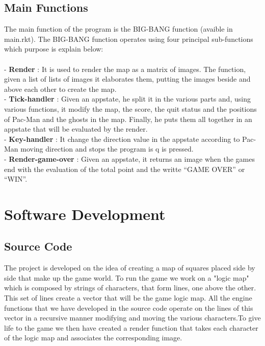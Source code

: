 \documentclass{article}
\begin{document}
 \subsection{Main Functions}
The main function of the program is the BIG-BANG function (avaible in main.rkt). The BIG-BANG function operates using four principal sub-functions which purpose is explain below:\\\\
- \textbf{Render} : It is used to render the map as a matrix of images. The function, given a list of lists of images it elaborates them, putting the images beside and above each other to create the map.\\
- \textbf{Tick-handler} : Given an appstate, he split it in the various parts and, using various functions, it modify the map, the score, the quit status and the positions of Pac-Man and the ghosts in the map. Finally, he puts them all together in an appstate that will be evaluated by the render. \\
- \textbf{Key-handler} : It change the direction value in the appstate according to Pac-Man moving direction and stops the program is q is pressed.\\
- \textbf{Render-game-over} : Given an appstate, it returns an image when the games end with the evaluation of the total point and the writte ``GAME OVER'' or ``WIN''.


 \section{Software Development}

 \subsection{Source Code}
 The project is developed on the idea of creating a map of squares placed side by side that make up the game world. To run the game we work on a "logic map" which is composed by strings of characters, that form lines, one above the other. This set of lines create a vector that will be the game logic map. All the engine functions that we have developed in the source code operate on the lines of this vector in a recursive manner modifying and moving the various characters.To give life to the game we then have created a render function that takes each character of the logic map and associates the corresponding image.\\
 
\end{document}
